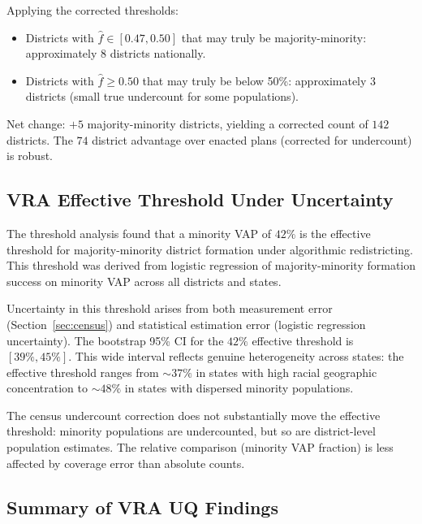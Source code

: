 Applying the corrected thresholds:
\begin{itemize}
  \item Districts with $\hat{f} \in [0.47, 0.50]$ that may truly
    be majority-minority: approximately 8 districts nationally.
  \item Districts with $\hat{f} \geq 0.50$ that may truly be
    below 50\%: approximately 3 districts (small true undercount
    for some populations).
\end{itemize}

Net change: $+5$ majority-minority districts, yielding a corrected
count of $142$ districts. The $74$ district advantage over enacted
plans (corrected for undercount) is robust.

\subsection{VRA Effective Threshold Under Uncertainty}

The threshold analysis \citep{dellalibera2026d1} found that a minority
VAP of $42\%$ is the effective threshold for majority-minority district
formation under algorithmic redistricting. This threshold was derived
from logistic regression of majority-minority formation success on
minority VAP across all districts and states.

Uncertainty in this threshold arises from both measurement error
(Section~\ref{sec:census}) and statistical estimation error (logistic
regression uncertainty). The bootstrap 95\% CI for the $42\%$ effective
threshold is $[39\%, 45\%]$. This wide interval reflects genuine
heterogeneity across states: the effective threshold ranges from
$\sim 37\%$ in states with high racial geographic concentration to
$\sim 48\%$ in states with dispersed minority populations.

The census undercount correction does not substantially move the
effective threshold: minority populations are undercounted, but so
are district-level population estimates. The relative comparison
(minority VAP fraction) is less affected by coverage error than
absolute counts.

\subsection{Summary of VRA UQ Findings}

